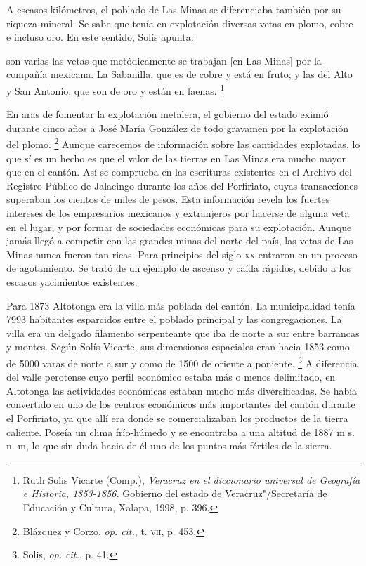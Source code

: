 \documentclass[14pt,twoside,final]{extbook} %
\let\oldfootnote\footnote
\renewcommand\footnote[1]{%
\oldfootnote{\hspace{1mm}#1}}
\begin{document}
A escasos kilómetros, el poblado de Las Minas se diferenciaba también por su riqueza mineral. Se sabe que tenía en explotación diversas vetas en plomo, cobre e incluso oro. En este sentido, Solís apunta:
\begin{quoting}
son varias las vetas que metódicamente se trabajan [en Las Minas] por la compañía mexicana. La Sabanilla, que es de cobre y está en fruto; y las del Alto y San Antonio, que son de oro y están en faenas.\footnote{Ruth Solis Vicarte (Comp.), \emph{Veracruz en el diccionario universal de Geografía e Historia, 1853-1856.} Gobierno del estado de Veracruz"/Secretaría de Educación y Cultura, Xalapa, 1998, p. 396.}
\end{quoting}
En aras de fomentar la explotación metalera, el gobierno del estado eximió durante cinco años a José María González de todo gravamen por la explotación del plomo.\footnote{Blázquez y Corzo, \emph{op. cit.}, t. \textsc{vii}, p. 453.} Aunque carecemos de información sobre las cantidades explotadas, lo que sí es un hecho es que el valor de las tierras en Las Minas era mucho mayor que en el cantón. Así se comprueba en las escrituras existentes en el Archivo del Registro Público de Jalacingo durante los años del Porfiriato, cuyas transacciones superaban los cientos de miles de pesos. Esta información revela los fuertes intereses de los empresarios mexicanos y extranjeros por hacerse de alguna veta en el lugar, y por formar de sociedades económicas para su explotación. Aunque jamás llegó a competir con las grandes minas del norte del país, las vetas de Las Minas nunca fueron tan ricas. Para principios del siglo \textsc{xx} entraron en un proceso de agotamiento. Se trató de un ejemplo de ascenso y caída rápidos, debido a los escasos yacimientos existentes.

Para 1873 Altotonga era la villa más poblada del cantón. La municipalidad tenía 7993 habitantes esparcidos entre el poblado principal y las congregaciones. La villa era un delgado filamento serpenteante que iba de norte a sur entre barrancas y montes. Según Solís Vicarte, sus dimensiones espaciales eran hacia 1853 como de 5000 varas de norte a sur y como de 1500 de oriente a poniente.\footnote{Solis, \emph{op. cit.}, p. 41.} A diferencia del valle perotense cuyo perfil económico estaba más o menos delimitado, en Altotonga las actividades económicas estaban mucho más diversificadas. Se había convertido en uno de los centros económicos más importantes del cantón durante el Porfiriato, ya que allí era donde se comercializaban los productos de la tierra caliente. Poseía un clima frío-húmedo y se encontraba a una altitud de 1887 m s. n. m, lo que sin duda hacia de él uno de los puntos más fértiles de la sierra.
\end{document}
